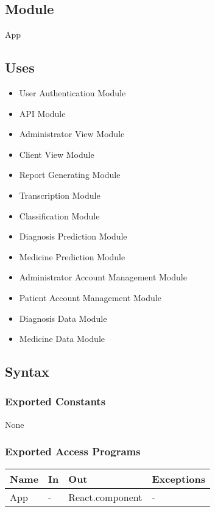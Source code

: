 \documentclass[12pt, titlepage]{article}
\begin{document}
\subsection{Module}

App

\subsection{Uses}

\begin{itemize}
  The app module uses all the inputs for the module listed here.
  \item User Authentication Module
  \item API Module
  \item Administrator View Module
  \item Client View Module
  \item Report Generating Module
  \item Transcription Module
  \item Classification Module
  \item Diagnosis Prediction Module
  \item Medicine Prediction Module
  \item Administrator Account Management Module
  \item Patient Account Management Module
  \item Diagnosis Data Module
  \item Medicine Data Module 
\end{itemize}

\subsection{Syntax}

\subsubsection{Exported Constants}

None

\subsubsection{Exported Access Programs}

\begin{center}
\begin{tabular}{p{2cm} p{4cm} p{4cm} p{2cm}}
\hline
\textbf{Name} & \textbf{In} & \textbf{Out} & \textbf{Exceptions} \\
\hline
App & - & React.component & - & \\
\hline
\end{tabular}
\end{center}
\end{document}

